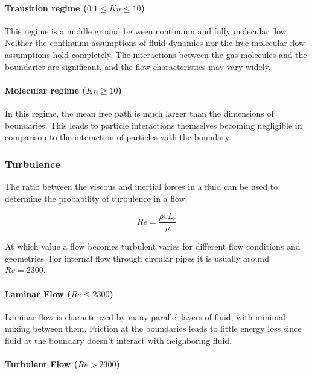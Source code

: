 	\newpage

\paragraph{Transition regime (\(0.1 \leq Kn \leq 10\))}
	
	This regime is a middle ground between continuum and fully molecular flow.
	Neither the continuum assumptions of fluid dynamics nor the free molecular flow assumptions hold completely.
	The interactions between the gas molecules and the boundaries are significant, and the flow characteristics may vary widely.

\paragraph{Molecular regime (\(Kn \geq 10\))}

	In this regime, the mean free path is much larger than the dimensions of boundaries.
	This leads to particle interactions themselves becoming negligible in comparison to the interaction of particles with the boundary.
	\cite{rapp2017microfluidics}

\subsubsection{Turbulence}

	The ratio between the viscous and inertial forces in a fluid can be used to determine the probability of turbulence in a flow.
	
	$$
		Re = \frac{\rho v L_c}{\mu}
	$$

	\noindent At which value a flow becomes turbulent varies for different flow conditions and geometries. For internal flow through circular pipes it is usually around $Re = 2300$. \cite{Cengel2017}
	
\paragraph{Laminar Flow (\(Re \le 2300\))}

	Laminar flow is characterized by many parallel layers of fluid, with minimal mixing between them.
	Friction at the boundaries leads to little energy loss since fluid at the boundary doesn't interact with neighboring fluid.
	
\paragraph{Turbulent Flow (\(Re > 2300\))}

